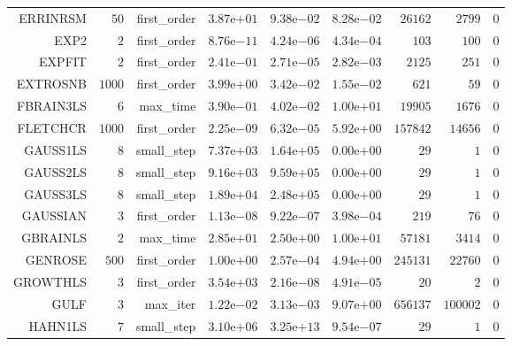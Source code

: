 \begin{longtable}{rrrrrrrrr}
ERRINRSM & \(    50\) & first\_order & \( 3.87\)e\(+01\) & \( 9.38\)e\(-02\) & \( 8.28\)e\(-02\) & \( 26162\) & \(  2799\) & \(     0\) \\
EXP2 & \(     2\) & first\_order & \( 8.76\)e\(-11\) & \( 4.24\)e\(-06\) & \( 4.34\)e\(-04\) & \(   103\) & \(   100\) & \(     0\) \\
EXPFIT & \(     2\) & first\_order & \( 2.41\)e\(-01\) & \( 2.71\)e\(-05\) & \( 2.82\)e\(-03\) & \(  2125\) & \(   251\) & \(     0\) \\
EXTROSNB & \(  1000\) & first\_order & \( 3.99\)e\(+00\) & \( 3.42\)e\(-02\) & \( 1.55\)e\(-02\) & \(   621\) & \(    59\) & \(     0\) \\
FBRAIN3LS & \(     6\) & max\_time & \( 3.90\)e\(-01\) & \( 4.02\)e\(-02\) & \( 1.00\)e\(+01\) & \( 19905\) & \(  1676\) & \(     0\) \\
FLETCHCR & \(  1000\) & first\_order & \( 2.25\)e\(-09\) & \( 6.32\)e\(-05\) & \( 5.92\)e\(+00\) & \(157842\) & \( 14656\) & \(     0\) \\
GAUSS1LS & \(     8\) & small\_step & \( 7.37\)e\(+03\) & \( 1.64\)e\(+05\) & \( 0.00\)e\(+00\) & \(    29\) & \(     1\) & \(     0\) \\
GAUSS2LS & \(     8\) & small\_step & \( 9.16\)e\(+03\) & \( 9.59\)e\(+05\) & \( 0.00\)e\(+00\) & \(    29\) & \(     1\) & \(     0\) \\
GAUSS3LS & \(     8\) & small\_step & \( 1.89\)e\(+04\) & \( 2.48\)e\(+05\) & \( 0.00\)e\(+00\) & \(    29\) & \(     1\) & \(     0\) \\
GAUSSIAN & \(     3\) & first\_order & \( 1.13\)e\(-08\) & \( 9.22\)e\(-07\) & \( 3.98\)e\(-04\) & \(   219\) & \(    76\) & \(     0\) \\
GBRAINLS & \(     2\) & max\_time & \( 2.85\)e\(+01\) & \( 2.50\)e\(+00\) & \( 1.00\)e\(+01\) & \( 57181\) & \(  3414\) & \(     0\) \\
GENROSE & \(   500\) & first\_order & \( 1.00\)e\(+00\) & \( 2.57\)e\(-04\) & \( 4.94\)e\(+00\) & \(245131\) & \( 22760\) & \(     0\) \\
GROWTHLS & \(     3\) & first\_order & \( 3.54\)e\(+03\) & \( 2.16\)e\(-08\) & \( 4.91\)e\(-05\) & \(    20\) & \(     2\) & \(     0\) \\
GULF & \(     3\) & max\_iter & \( 1.22\)e\(-02\) & \( 3.13\)e\(-03\) & \( 9.07\)e\(+00\) & \(656137\) & \(100002\) & \(     0\) \\
HAHN1LS & \(     7\) & small\_step & \( 3.10\)e\(+06\) & \( 3.25\)e\(+13\) & \( 9.54\)e\(-07\) & \(    29\) & \(     1\) & \(     0\) \\

\end{longtable}
